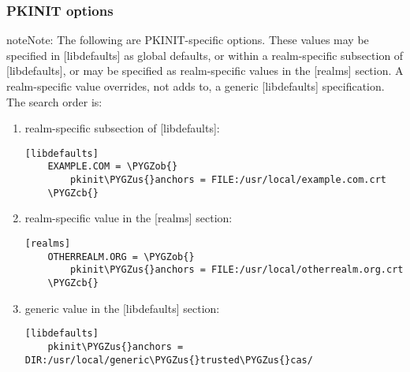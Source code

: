 \documentclass[letterpaper,10pt,english]{sphinxmanual}
\def\PYGZus{\char`\_}
\def\PYGZob{\char`\{}
\def\PYGZcb{\char`\}}
\begin{document}
\subsubsection{PKINIT options}
\label{admin/conf_files/krb5_conf:pkinit-options}
\begin{notice}{note}{Note:}
The following are PKINIT-specific options.  These values may
be specified in {[}libdefaults{]} as global defaults, or within
a realm-specific subsection of {[}libdefaults{]}, or may be
specified as realm-specific values in the {[}realms{]} section.
A realm-specific value overrides, not adds to, a generic
{[}libdefaults{]} specification.  The search order is:
\end{notice}
\begin{enumerate}
\item {} 
realm-specific subsection of {[}libdefaults{]}:

\begin{Verbatim}[commandchars=\\\{\}]
[libdefaults]
    EXAMPLE.COM = \PYGZob{}
        pkinit\PYGZus{}anchors = FILE:/usr/local/example.com.crt
    \PYGZcb{}
\end{Verbatim}

\item {} 
realm-specific value in the {[}realms{]} section:

\begin{Verbatim}[commandchars=\\\{\}]
[realms]
    OTHERREALM.ORG = \PYGZob{}
        pkinit\PYGZus{}anchors = FILE:/usr/local/otherrealm.org.crt
    \PYGZcb{}
\end{Verbatim}

\item {} 
generic value in the {[}libdefaults{]} section:

\begin{Verbatim}[commandchars=\\\{\}]
[libdefaults]
    pkinit\PYGZus{}anchors = DIR:/usr/local/generic\PYGZus{}trusted\PYGZus{}cas/
\end{Verbatim}

\end{enumerate}
\end{document}
